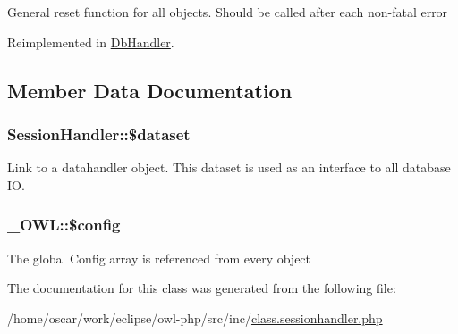 General reset function for all objects. Should be called after each non-fatal error 

Reimplemented in \hyperlink{classDbHandler_9982df4830f05803935bb31bac7fae3d}{DbHandler}.

\subsection{Member Data Documentation}
\hypertarget{classSessionHandler_74c46fcfbadd4c4e6bacc73ddf350056}{
\subsubsection{\setlength{\rightskip}{0pt plus 5cm}SessionHandler::\$dataset}}
\label{classSessionHandler_74c46fcfbadd4c4e6bacc73ddf350056}


Link to a datahandler object. This dataset is used as an interface to all database IO. \hypertarget{class__OWL_f37a011667dda12fc417a68a6f3077d1}{
\subsubsection{\setlength{\rightskip}{0pt plus 5cm}\_\-OWL::\$config}}
\label{class__OWL_f37a011667dda12fc417a68a6f3077d1}


The global Config array is referenced from every object 

The documentation for this class was generated from the following file:\begin{CompactItemize}
\item 
/home/oscar/work/eclipse/owl-php/src/inc/\hyperlink{class_8sessionhandler_8php}{class.sessionhandler.php}\end{CompactItemize}
